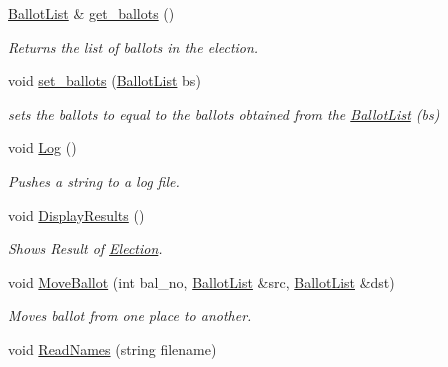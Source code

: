 \begin{DoxyCompactItemize}
\item 
\hyperlink{class_ballot_list}{Ballot\+List} \& \hyperlink{class_election_aff53e44590e75eabca7ca1f10f287c2a}{get\+\_\+ballots} ()\hypertarget{class_election_aff53e44590e75eabca7ca1f10f287c2a}{}\label{class_election_aff53e44590e75eabca7ca1f10f287c2a}

\begin{DoxyCompactList}\small\item\em Returns the list of ballots in the election. \end{DoxyCompactList}\item 
void \hyperlink{class_election_a4bf9c6eb717929f143ea89718cb09fe9}{set\+\_\+ballots} (\hyperlink{class_ballot_list}{Ballot\+List} bs)
\begin{DoxyCompactList}\small\item\em sets the ballots to equal to the ballots obtained from the \hyperlink{class_ballot_list}{Ballot\+List} (bs) \end{DoxyCompactList}\item 
void \hyperlink{class_election_a70752317f5b403a3e779b3bf2a8c91f6}{Log} ()\hypertarget{class_election_a70752317f5b403a3e779b3bf2a8c91f6}{}\label{class_election_a70752317f5b403a3e779b3bf2a8c91f6}

\begin{DoxyCompactList}\small\item\em Pushes a string to a log file. \end{DoxyCompactList}\item 
void \hyperlink{class_election_a769bc27e7ab0a091eee5d11f3b382032}{Display\+Results} ()\hypertarget{class_election_a769bc27e7ab0a091eee5d11f3b382032}{}\label{class_election_a769bc27e7ab0a091eee5d11f3b382032}

\begin{DoxyCompactList}\small\item\em Shows Result of \hyperlink{class_election}{Election}. \end{DoxyCompactList}\item 
void \hyperlink{class_election_ad9b7c2ce89047e79429c6ba00f428343}{Move\+Ballot} (int bal\+\_\+no, \hyperlink{class_ballot_list}{Ballot\+List} \&src, \hyperlink{class_ballot_list}{Ballot\+List} \&dst)
\begin{DoxyCompactList}\small\item\em Moves ballot from one place to another. \end{DoxyCompactList}\item 
void \hyperlink{class_election_ad8977ccd4118d7995bf286886759bbcf}{Read\+Names} (string filename)\hypertarget{class_election_ad8977ccd4118d7995bf286886759bbcf}{}\label{class_election_ad8977ccd4118d7995bf286886759bbcf}


\end{DoxyCompactItemize}
